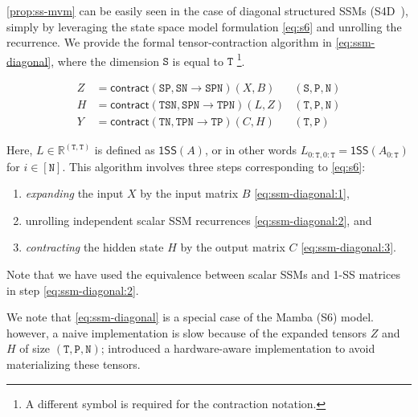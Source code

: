 \ref{prop:ss-mvm} can be easily seen in the case of diagonal structured SSMs (S4D~\citep{gu2022parameterization}),
simply by leveraging the state space model formulation \eqref{eq:s6} and unrolling the recurrence. We provide the formal tensor-contraction algorithm in \eqref{eq:ssm-diagonal}, where the dimension $\mathtt{S}$ is equal to $\mathtt{T}$
\footnote{A different symbol is required for the contraction notation.}.

\begin{subequations}
  \label{eq:ssm-diagonal}
  \begin{align}
    \label{eq:ssm-diagonal:1}
    Z &= \mathsf{contract}(\mathtt{SP},\mathtt{SN} \to \mathtt{SPN})(X, B) & \mathtt{(S,P,N)} \\
    \label{eq:ssm-diagonal:2}
    H &= \mathsf{contract}(\mathtt{TSN},\mathtt{SPN} \to \mathtt{TPN})(L, Z) & \mathtt{(T,P,N)} \\
    \label{eq:ssm-diagonal:3}
    Y &= \mathsf{contract}(\mathtt{TN},\mathtt{TPN} \to \mathtt{TP})(C, H) & \mathtt{(T,P)}
  \end{align}
\end{subequations}

Here, $L \in \mathbb{R}^{(\mathtt{T},\mathtt{T})}$ is defined as $\mathsf{1SS}(A)$, or in other words $L_{0:\mathtt{T},0:\mathtt{T}} = \mathsf{1SS}(A_{0:\mathtt{T}})$ for $i \in [\mathtt{N}]$.
This algorithm involves three steps corresponding to \eqref{eq:s6}:

\begin{enumerate}[label=(\roman*)]
  \item \emph{expanding} the input $X$ by the input matrix $B$ \eqref{eq:ssm-diagonal:1},
  \item unrolling independent scalar SSM recurrences \eqref{eq:ssm-diagonal:2}, and \item \emph{contracting} the hidden state $H$ by the output matrix $C$ \eqref{eq:ssm-diagonal:3}.
\end{enumerate}

Note that we have used the equivalence between scalar SSMs and 1-SS matrices in step \eqref{eq:ssm-diagonal:2}.

\begin{remark}
  We note that \eqref{eq:ssm-diagonal} is a special case of the Mamba (S6) model. however, a naive implementation is slow because of the expanded tensors $Z$ and $H$ of size $\mathtt{(T,P,N)}$;
  \citep{gu2023mamba} introduced a hardware-aware implementation to avoid materializing these tensors.
\end{remark}

